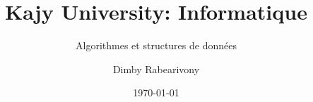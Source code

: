 \documentclass[11pt,fancy,authorye]{elegantbook}
\title{Kajy University: Informatique}
\subtitle{Algorithmes et structures de données}
\author{Dimby Rabearivony}
\date{\today}
\begin{document}
	
	\maketitle
	
	\frontmatter
	\tableofcontents
	
	\mainmatter
	
	
	
	
	
	


\nocite{*}

	
\end{document}
